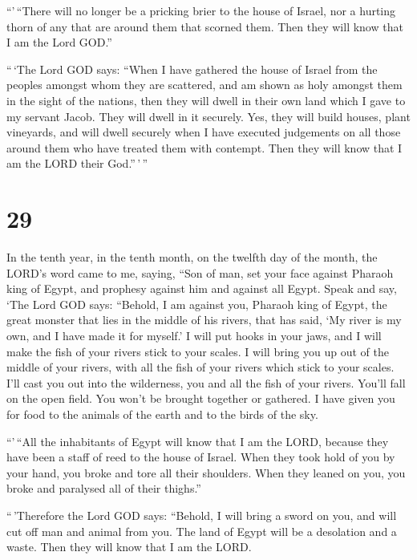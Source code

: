  ``'\,``There will no longer be a pricking brier to the
house of Israel, nor a hurting thorn of any that are around them that
scorned them. Then they will know that I am the Lord GOD.''

 ``\,`The Lord GOD says: ``When I have gathered the house
of Israel from the peoples amongst whom they are scattered, and am shown
as holy amongst them in the sight of the nations, then they will dwell
in their own land which I gave to my servant Jacob.  They
will dwell in it securely. Yes, they will build houses, plant vineyards,
and will dwell securely when I have executed judgements on all those
around them who have treated them with contempt. Then they will know
that I am the LORD their God.''\,'\,''

\hypertarget{section-27}{%
\section{29}\label{section-27}}

 In the tenth year, in the tenth month, on the twelfth day
of the month, the LORD's word came to me, saying,  ``Son
of man, set your face against Pharaoh king of Egypt, and prophesy
against him and against all Egypt.  Speak and say, `The
Lord GOD says: ``Behold, I am against you, Pharaoh king of Egypt, the
great monster that lies in the middle of his rivers, that has said, `My
river is my own, and I have made it for myself.'  I will
put hooks in your jaws, and I will make the fish of your rivers stick to
your scales. I will bring you up out of the middle of your rivers, with
all the fish of your rivers which stick to your scales. 
I'll cast you out into the wilderness, you and all the fish of your
rivers. You'll fall on the open field. You won't be brought together or
gathered. I have given you for food to the animals of the earth and to
the birds of the sky.

 ``'\,``All the inhabitants of Egypt will know that I am
the LORD, because they have been a staff of reed to the house of Israel.
 When they took hold of you by your hand, you broke and
tore all their shoulders. When they leaned on you, you broke and
paralysed all of their thighs.''

 ``\,'Therefore the Lord GOD says: ``Behold, I will bring
a sword on you, and will cut off man and animal from you. 
The land of Egypt will be a desolation and a waste. Then they will know
that I am the LORD.

